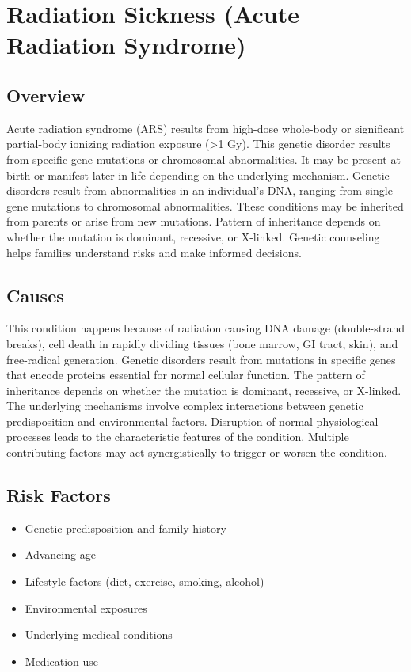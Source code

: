 \chapter{Radiation Sickness (Acute Radiation Syndrome)}
\label{sec:Radiation Sickness}

\section{Overview}
Acute radiation syndrome (ARS) results from high-dose whole-body or significant partial-body ionizing radiation exposure (>1 Gy). This genetic disorder results from specific gene mutations or chromosomal abnormalities. It may be present at birth or manifest later in life depending on the underlying mechanism. Genetic disorders result from abnormalities in an individual's DNA, ranging from single-gene mutations to chromosomal abnormalities. These conditions may be inherited from parents or arise from new mutations. Pattern of inheritance depends on whether the mutation is dominant, recessive, or X-linked. Genetic counseling helps families understand risks and make informed decisions.
\section{Causes}
This condition happens because of radiation causing DNA damage (double-strand breaks), cell death in rapidly dividing tissues (bone marrow, GI tract, skin), and free-radical generation. Genetic disorders result from mutations in specific genes that encode proteins essential for normal cellular function. The pattern of inheritance depends on whether the mutation is dominant, recessive, or X-linked. The underlying mechanisms involve complex interactions between genetic predisposition and environmental factors. Disruption of normal physiological processes leads to the characteristic features of the condition. Multiple contributing factors may act synergistically to trigger or worsen the condition.
\section{Risk Factors}


\begin{itemize}[noitemsep]
  \item Genetic predisposition and family history
  \item Advancing age
  \item Lifestyle factors (diet, exercise, smoking, alcohol)
  \item Environmental exposures
  \item Underlying medical conditions
  \item Medication use
\end{itemize}

